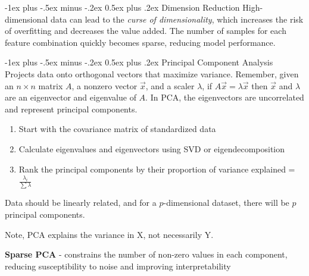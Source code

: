 \documentclass[10pt,landscape]{article}
\makeatletter
\renewcommand{\section}{\@startsection{section}{1}{0mm}%
                                {-1ex plus -.5ex minus -.2ex}%
                                {0.5ex plus .2ex}%
                                {\normalfont\large\bfseries}}
\renewcommand{\subsection}{\@startsection{subsection}{2}{0mm}%
                                {-1ex plus -.5ex minus -.2ex}%
                                {0.5ex plus .2ex}%
                                {\normalfont\normalsize\bfseries}}
\makeatother
\begin{document}
\begin{multicols}{3}
\section{Dimension Reduction}
High-dimensional data can lead to the \emph{curse of dimensionality}, which increases the risk of overfitting and decreases the value added. The number of samples for each feature combination quickly becomes sparse, reducing model performance.

\subsection{Principal Component Analysis}
Projects data onto orthogonal vectors that maximize variance.
Remember, given an $n\times n$ matrix $A$, a nonzero vector $\vec{x}$, and a scaler $\lambda$, if $A\vec{x} = \lambda \vec{x}$ then $\vec{x}$ and $\lambda$ are an eigenvector and eigenvalue of $A$. In PCA, the eigenvectors are uncorrelated and represent principal components.
\begin{enumerate}[leftmargin=5mm]
\itemsep -.4mm
\item Start with the covariance matrix of standardized data
\item Calculate eigenvalues and eigenvectors using SVD or eigendecomposition
\item Rank the principal components by their proportion of variance explained = $\frac{\lambda_i}{\sum{\lambda}}$
\end{enumerate}

Data should be linearly related, and for a $p$-dimensional dataset, there will be $p$ principal components.

Note, PCA explains the variance in X, not necessarily Y.

\textbf{Sparse PCA} - constrains the number of non-zero values in each component, reducing susceptibility to noise and improving interpretability

\end{multicols}
\end{document}
